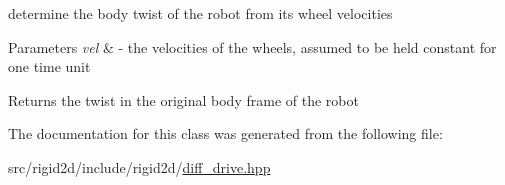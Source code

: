 determine the body twist of the robot from its wheel velocities 


\begin{DoxyParams}{Parameters}
{\em vel} & -\/ the velocities of the wheels, assumed to be held constant for one time unit \\
\hline
\end{DoxyParams}
\begin{DoxyReturn}{Returns}
the twist in the original body frame of the robot 
\end{DoxyReturn}


The documentation for this class was generated from the following file\+:\begin{DoxyCompactItemize}
\item 
src/rigid2d/include/rigid2d/\hyperlink{diff__drive_8hpp}{diff\+\_\+drive.\+hpp}\end{DoxyCompactItemize}
